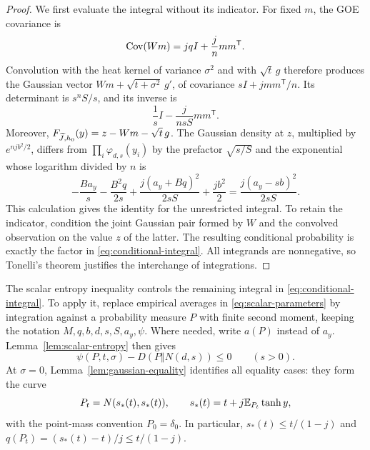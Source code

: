\begin{proof}
We first evaluate the integral without its indicator. For fixed $m$,
the GOE covariance is
\[
 \operatorname{Cov}(Wm)=jqI+\frac jnmm^{\mathsf T}.
\]
Convolution with the heat kernel of variance $\sigma^2$ and with
$\sqrt t\,g$ therefore produces the Gaussian vector
$Wm+\sqrt{t+\sigma^2}\,g'$, of covariance
$sI+jmm^{\mathsf T}/n$.  Its determinant is $s^nS/s$, and its inverse
is
\[
 \frac1sI-\frac{j}{nsS}mm^{\mathsf T}.
\]
Moreover,
$F_{\widetilde J,h_0}(y)=z-Wm-\sqrt t\,g$.  The Gaussian density at $z$,
multiplied by $e^{njb^2/2}$, differs from
$\prod_i\varphi_{d,s}(y_i)$ by the prefactor $\sqrt{s/S}$ and the
exponential whose logarithm divided by $n$ is
\[
 -\frac{Ba_y}{s}-\frac{B^2q}{2s}
 +\frac{j(a_y+Bq)^2}{2sS}+\frac{jb^2}{2}
 =\frac{j(a_y-sb)^2}{2sS}.
\]
This calculation gives the identity for the unrestricted integral.
To retain the indicator, condition the joint Gaussian pair formed by
$W$ and the convolved observation on the value $z$ of the latter.
The resulting conditional probability is exactly the factor in
\eqref{eq:conditional-integral}. All integrands are nonnegative, so
Tonelli's theorem justifies the interchange of integrations.
\end{proof}

The scalar entropy inequality controls the remaining integral in
\eqref{eq:conditional-integral}. To apply it, replace empirical averages
in \eqref{eq:scalar-parameters} by integration against a probability
measure $P$ with finite second moment, keeping the notation
$M,q,b,d,s,S,a_y,\psi$. Where needed, write $a(P)$ instead of $a_y$.
Lemma~\ref{lem:scalar-entropy} then gives
\begin{equation}
 \psi(P,t,\sigma)-D(P\Vert N(d,s))\le0
 \qquad (s>0).
 \label{eq:rate-nonpositive}
\end{equation}
At $\sigma=0$, Lemma~\ref{lem:gaussian-equality} identifies all equality
cases: they form the curve
\[
 P_t=N(s_*(t),s_*(t)),\qquad
 s_*(t)=t+j\mathbb E_{P_t}\tanh y,
\]
with the point-mass convention $P_0=\delta_0$.  In particular,
$s_*(t)\le t/(1-j)$ and
$q(P_t)=(s_*(t)-t)/j\le t/(1-j)$.

